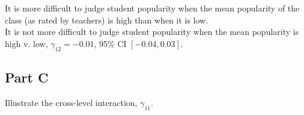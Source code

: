 \documentclass[]{article}
\newenvironment{Shaded}{\begin{snugshade}}{\end{snugshade}}
\newcommand{\KeywordTok}[1]{\textcolor[rgb]{0.13,0.29,0.53}{\textbf{#1}}}
\newcommand{\DataTypeTok}[1]{\textcolor[rgb]{0.13,0.29,0.53}{#1}}
\newcommand{\DecValTok}[1]{\textcolor[rgb]{0.00,0.00,0.81}{#1}}
\newcommand{\StringTok}[1]{\textcolor[rgb]{0.31,0.60,0.02}{#1}}
\newcommand{\CommentTok}[1]{\textcolor[rgb]{0.56,0.35,0.01}{\textit{#1}}}
\newcommand{\OperatorTok}[1]{\textcolor[rgb]{0.81,0.36,0.00}{\textbf{#1}}}
\newcommand{\NormalTok}[1]{#1}
\begin{document}
It is more difficult to judge student popularity when the mean
popularity of the class (as rated by teachers) is high than when it is
low.\\
It is not more difficult to judge student popularity when the mean
popularity is high v. low, \(\gamma_{12} = -0.01\), 95\% CI
\([-0.04, 0.03]\).

\subsection{Part C}\label{part-c-1}

Illustrate the cross-level interaction, \(\gamma_{11}\).

\begin{Shaded}
\end{Shaded}
\end{document}
